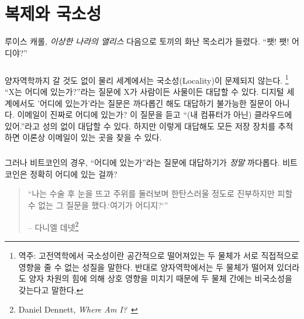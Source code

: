 \chapter{복제와 국소성}
\label{les:3}

\begin{chapquote}{루이스 캐롤, \textit{이상한 나라의 앨리스}}
	다음으로 토끼의 화난 목소리가 들렸다. \enquote{팻! 팻! 어디야?}
\end{chapquote}

\paragraph{}
양자역학까지 갈 것도 없이 물리 세계에서는 국소성(Locality)이 문제되지 않는다.
\footnote{역주: 고전역학에서 국소성이란 공간적으로 떨어져있는 두 물체가 서로 직접적으로 영향을 줄 수 없는 성질을 말한다. 
반대로 양자역학에서는 두 물체가 떨어져 있더라도 양자 차원의 힘에 의해 상호 영향을 미치기 때문에 두 물체 간에는 비국소성을 갖는다고 말한다.}
\enquote{X는 어디에 있는가?}라는 질문에 X가 사람이든 사물이든 대답할 수 있다. 
디지털 세계에서도 '어디에 있는가'라는 질문은 까다롭긴 해도 대답하기 불가능한 질문이 아니다. 
이메일이 진짜로 어디에 있는가? 이 질문을 듣고 \enquote{(내 컴퓨터가 아닌) 클라우드에 있어.}라고 성의 없이 대답할 수 있다.
하지만 이렇게 대답해도 모든 저장 장치를 추적하면 이론상 이메일이 있는 곳을 찾을 수 있다.

\paragraph{}
그러나 비트코인의 경우, \enquote{어디에 있는가}라는 질문에 대답하기가 \textit{정말} 까다롭다. 비트코인은 정확히 어디에 있는 걸까?

\begin{quotation}\begin{samepage}
		\enquote{나는 수술 후 눈을 뜨고 주위를 둘러보며 한탄스러울 정도로 진부하지만 피할 수 없는 그 질문을 했다.`여기가 어디지?`}
		\begin{flushright} -- 다니엘 데넷\footnote{Daniel Dennett, \textit{Where Am I?}~\cite{where-am-i}}
		\end{flushright}
\end{samepage}\end{quotation}

